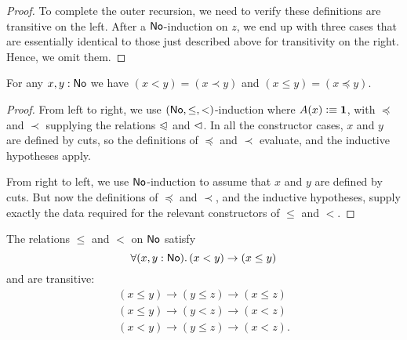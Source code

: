\begin{proof}
  To complete the outer recursion, we need to verify these definitions are transitive on the left.
  After a $\mathsf{No}$-induction on $z$, we end up with three cases that are essentially identical to those just described above for transitivity on the right.
  Hence, we omit them.
\end{proof}

\begin{thm}\label{thm:NO-encode-decode}
  For any $x,y:\mathsf{No}$ we have $(x<y)=(x\prec y)$ and $(x\le y)=(x\preceq y)$.
\end{thm}
\begin{proof}
  From left to right, we use $(\mathsf{No},\le,<)$-induction where $A(x)\vcentcolon\equiv\mathbf{1}$, with $\preceq$ and $\prec$ supplying the relations $\trianglelefteqslant$ and $\vartriangleleft$.
  In all the constructor cases, $x$ and $y$ are defined by cuts, so the definitions of $\preceq$ and $\prec$ evaluate, and the inductive hypotheses apply.

  From right to left, we use $\mathsf{No}$-induction to assume that $x$ and $y$ are defined by cuts.
  But now the definitions of $\preceq$ and $\prec$, and the inductive hypotheses, supply exactly the data required for the relevant constructors of $\le$ and $<$.
\end{proof}

\begin{cor}\label{thm:NO-unstrict-transitive}
  The relations $\le$ and $<$ on $\mathsf{No}$ satisfy
  \[ \fall{x,y:\NO} (x<y) \to (x\le y) \]
  and are transitive:
  \begin{gather*}
    (x\le y) \to (y\le z) \to (x\le z)\\
    (x\le y) \to (y< z) \to (x< z)\\
    (x< y) \to (y\le z) \to (x< z).
  \end{gather*}
\end{cor}



